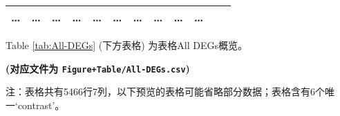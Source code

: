 \documentclass[
]{article}
\begin{document}
\begin{longtable}[]{@{}llllllllllll@{}}
\begin{minipage}[t]{0.06\columnwidth}
\ldots{}\strut
\end{minipage} & \begin{minipage}[t]{0.06\columnwidth}\raggedright
\ldots{}\strut
\end{minipage} & \begin{minipage}[t]{0.06\columnwidth}\raggedright
\ldots{}\strut
\end{minipage} & \begin{minipage}[t]{0.06\columnwidth}\raggedright
\ldots{}\strut
\end{minipage} & \begin{minipage}[t]{0.06\columnwidth}\raggedright
\ldots{}\strut
\end{minipage} & \begin{minipage}[t]{0.08\columnwidth}\raggedright
\ldots{}\strut
\end{minipage} & \begin{minipage}[t]{0.06\columnwidth}\raggedright
\ldots{}\strut
\end{minipage} & \begin{minipage}[t]{0.06\columnwidth}\raggedright
\ldots{}\strut
\end{minipage} & \begin{minipage}[t]{0.09\columnwidth}\raggedright
\ldots{}\strut
\end{minipage} & \begin{minipage}[t]{0.02\columnwidth}\raggedright
\ldots{}\strut
\end{minipage}\tabularnewline
\bottomrule
\end{longtable}

Table \ref{tab:All-DEGs} (下方表格) 为表格All DEGs概览。

\textbf{(对应文件为 \texttt{Figure+Table/All-DEGs.csv})}

\begin{center}\begin{tcolorbox}[colback=gray!10, colframe=gray!50, width=0.9\linewidth, arc=1mm, boxrule=0.5pt]注：表格共有5466行7列，以下预览的表格可能省略部分数据；表格含有6个唯一`contrast'。
\end{tcolorbox}
\end{center}
\end{document}
